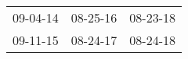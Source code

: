 \begin{supertabular}{lll}
 09-04-14\textsuperscript{} &  08-25-16\textsuperscript{} &  08-23-18\textsuperscript{} \\
 09-11-15\textsuperscript{} &  08-24-17\textsuperscript{} &  08-24-18\textsuperscript{} \\
\end{supertabular}
